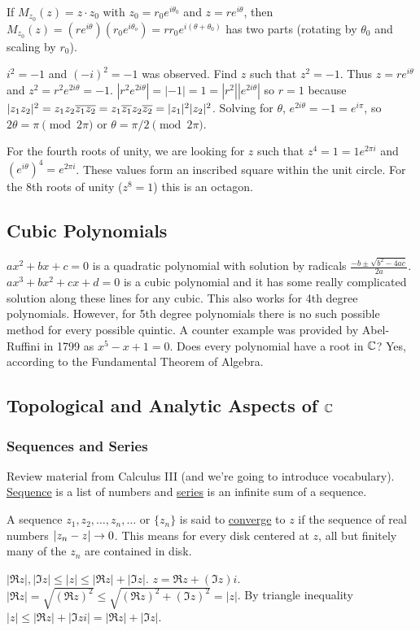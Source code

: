 \documentclass[]{article}
\begin{document}
If $M_{z_0} (z) = z\cdot z_0$ with $z_0=r_0e^{i\theta_0}$ and $z=re^{i\theta}$, then $M_{z_0}(z) = (re^{i\theta})(r_0e^{i\theta_o})=rr_0e^{i(\theta+\theta_0)}$ has two parts (rotating by $\theta_0$ and scaling by $r_0$).

\begin{example}
	 $i^2=-1$ and $(-i)^2=-1$ was observed. Find $z$ such that $z^2=-1$. Thus $z=re^{i\theta}$ and $z^2=r^2e^{2i\theta}=-1$. $|r^2e^{2i\theta}|=|-1|=1=|r^2| |e^{2i\theta}|$ so $r=1$ because $|z_1 z_2|^2 = z_1z_2 \overline{z_1 z_2}= z_1\overline{z_1} z_2\overline{z_2} = |z_1|^2 |z_2|^2$. Solving for $\theta$, $e^{2i\theta}=-1=e^{i\pi}$, so $2\theta=\pi\pmod{2\pi}$ or $\theta=\pi/2\pmod{2\pi}$.
\end{example}

For the fourth roots of unity, we are looking for $z$ such that $z^4=1=1e^{2\pi i}$ and $(e^{i\theta})^4=e^{2\pi i}$. These values form an inscribed square within the unit circle. For the 8th roots of unity ($z^8=1$) this is an octagon.

\subsection{Cubic Polynomials}
$ax^2+bx+c=0$ is a quadratic polynomial with solution by radicals $\frac{-b\pm\sqrt{b^2-4ac}}{2a}$.
$ax^3+bx^2+cx+d=0$ is a cubic polynomial and it has some really complicated solution along these lines for any cubic. This also works for 4th degree polynomials. However, for 5th degree polynomials there is no such possible method for every possible quintic. A counter example was provided by Abel-Ruffini in 1799 as $x^5-x+1=0$. Does every polynomial have a root in $\mathbb{C}$? Yes, according to the Fundamental Theorem of Algebra.

\subsection{Topological and Analytic Aspects of $\mathbb{C}$}
\subsubsection{Sequences and Series}
Review material from Calculus III (and we're going to introduce vocabulary).
\underline{Sequence} is a list of numbers and \underline{series} is an infinite sum of a sequence.

\begin{definition}
	A sequence $z_1,z_2,\dots,z_n,\dots$ or $\{z_n\}$ is said to \underline{converge} to $z$ if the sequence of real numbers $|z_n-z|\rightarrow 0$. This means for every disk centered at $z$, all but finitely many of the $z_n$ are contained in disk.
\end{definition}
\begin{note}
	$|\Re{z}|,|\Im{z}|\leq|z|\leq|\Re{z}|+|\Im{z}|$. $z=\Re z + (\Im z )i$. $|\Re z|=\sqrt{(\Re z)^2}\leq\sqrt{(\Re z)^2+(\Im z)^2}=|z|$. By triangle inequality $|z|\leq|\Re z|+ |\Im z i| = |\Re z| + |\Im z|$.
\end{note}
\end{document}
